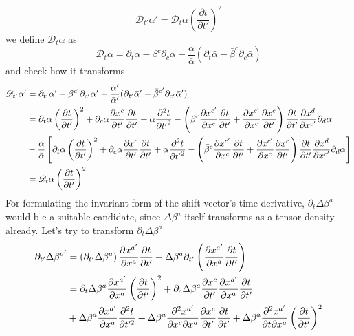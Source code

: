 \documentclass[letterpaper,nofootinbib,prd,amsmath,onecolumn]{revtex4-1}
\begin{document}
\[
\mathscr{D}_{t'}\alpha' = \mathscr{D}_{t}\alpha\left(\frac{\partial t}{\partial t'}\right)^{2}
\]
we define $\mathscr{D}_{t}\alpha$ as
\begin{equation}
\mathscr{D}_{t}\alpha = \partial_{t}\alpha - \beta^{c}\partial_{c}\alpha - \frac{\alpha}{{\bar \alpha}}(\partial_{t}{\bar \alpha} - {\bar \beta}^{c}\partial_{c}{\bar \alpha})
\end{equation}
and check how it transforms
\begin{align}
\mathscr{D}_{t'}\alpha' & = \partial_{t'}\alpha' - \beta^{c'}\partial_{c'}\alpha' - \frac{\alpha'}{{\bar \alpha}'}(\partial_{t'}{\bar \alpha}' - {\bar \beta}^{c'}\partial_{c'}{\bar \alpha}')\notag\\
& = \partial_{t}\alpha\left(\frac{\partial t}{\partial t'}\right)^{2} + \partial_{c}\alpha\frac{\partial x^{c}}{\partial t'}\frac{\partial t}{\partial t'} + \alpha\frac{\partial^{2}t}{\partial {t'}^{2}} - \left(\beta^{c}\frac{\partial x^{c'}}{\partial x^{c}}\frac{\partial t}{\partial t'} + \frac{\partial x^{c'}}{\partial x^{c}}\frac{\partial x^{c}}{\partial t'}\right)\frac{\partial t}{\partial t'}\frac{\partial x^{d}}{\partial x^{c'}}\partial_{d}\alpha\notag\\
& - \frac{\alpha}{{\bar \alpha}}\left[\partial_{t}{\bar \alpha}\left(\frac{\partial t}{\partial t'}\right)^{2} + \partial_{c}{\bar \alpha}\frac{\partial x^{c}}{\partial t'}\frac{\partial t}{\partial t'} + {\bar \alpha}\frac{\partial^{2}t}{\partial {t'}^{2}} - \left({\bar\beta}^{c}\frac{\partial x^{c'}}{\partial x^{c}}\frac{\partial t}{\partial t'} + \frac{\partial x^{c'}}{\partial x^{c}}\frac{\partial x^{c}}{\partial t'}\right)\frac{\partial t}{\partial t'}\frac{\partial x^{d}}{\partial x^{c'}}\partial_{d}{\bar\alpha}\right]\notag\\
& = \mathscr{D}_{t}\alpha\left(\frac{\partial t}{\partial t'}\right)^{2}
\end{align}
For formulating the invariant form of the shift vector's time derivative, $\partial_{t}\Delta \beta^{a}$ would b
e a suitable candidate, since $\Delta \beta^{a}$ itself transforms as a tensor density already. Let's try to transform $\partial_{t} \Delta \beta^{a}$
\begin{align}\label{time derivative delta beta} 
\partial_{t'}\Delta \beta^{a'} & = \left(\partial_{t'}\Delta \beta^{a}\right)\frac{\partial x^{a'}}{\partial x^{a}}\frac{\partial t}{\partial t'} + \Delta \beta^{a}\partial_{t'}\left(\frac{\partial x^{a'}}{\partial x^{a}}\frac{\partial t}{\partial t'}\right)\notag\\
& = \partial_{t}\Delta \beta^{a}\frac{\partial x^{a'}}{\partial x^{a}}\left(\frac{\partial t}{\partial t'}\right)^{2} + \partial_{c}\Delta \beta^{a}\frac{\partial x^{c}}{\partial t'}\frac{\partial x^{a'}}{\partial x^{a}}\frac{\partial t}{\partial t'}\notag\\
& + \Delta \beta^{a}\frac{\partial x^{a'}}{\partial x^{a}}\frac{\partial^{2}t}{\partial t'^{2}} + \Delta \beta^{a}\frac{\partial^{2} x^{a'}}{\partial x^{c}\partial x^{a}}\frac{\partial x^{c}}{\partial t'}\frac{\partial t}{\partial t'} + \Delta \beta^{a}\frac{\partial^{2}x^{a'}}{\partial t\partial x^{a}}\left(\frac{\partial t}{\partial t'}\right)^{2}
\end{align}
\end{document}
